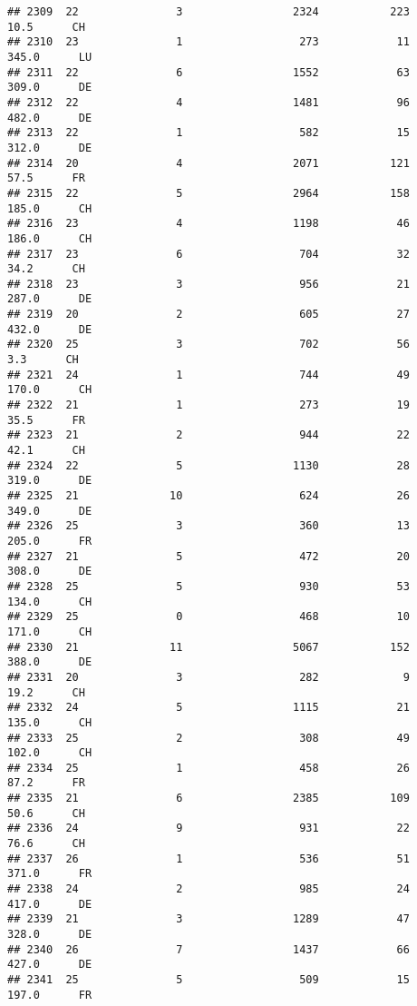 \documentclass[
]{article}
\begin{document}
\begin{verbatim}
## 2309  22               3                 2324           223     10.5      CH
## 2310  23               1                  273            11    345.0      LU
## 2311  22               6                 1552            63    309.0      DE
## 2312  22               4                 1481            96    482.0      DE
## 2313  22               1                  582            15    312.0      DE
## 2314  20               4                 2071           121     57.5      FR
## 2315  22               5                 2964           158    185.0      CH
## 2316  23               4                 1198            46    186.0      CH
## 2317  23               6                  704            32     34.2      CH
## 2318  23               3                  956            21    287.0      DE
## 2319  20               2                  605            27    432.0      DE
## 2320  25               3                  702            56      3.3      CH
## 2321  24               1                  744            49    170.0      CH
## 2322  21               1                  273            19     35.5      FR
## 2323  21               2                  944            22     42.1      CH
## 2324  22               5                 1130            28    319.0      DE
## 2325  21              10                  624            26    349.0      DE
## 2326  25               3                  360            13    205.0      FR
## 2327  21               5                  472            20    308.0      DE
## 2328  25               5                  930            53    134.0      CH
## 2329  25               0                  468            10    171.0      CH
## 2330  21              11                 5067           152    388.0      DE
## 2331  20               3                  282             9     19.2      CH
## 2332  24               5                 1115            21    135.0      CH
## 2333  25               2                  308            49    102.0      CH
## 2334  25               1                  458            26     87.2      FR
## 2335  21               6                 2385           109     50.6      CH
## 2336  24               9                  931            22     76.6      CH
## 2337  26               1                  536            51    371.0      FR
## 2338  24               2                  985            24    417.0      DE
## 2339  21               3                 1289            47    328.0      DE
## 2340  26               7                 1437            66    427.0      DE
## 2341  25               5                  509            15    197.0      FR

\end{verbatim}
\end{document}
